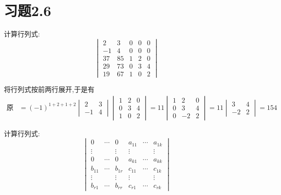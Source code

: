 \documentclass{ctexart}
\begin{document}
\section*{习题2.6}
\begin{homework}[1]
    计算行列式:
    \[\begin{vmatrix}
        2&3&0&0&0\\
        -1&4&0&0&0\\
        37&85&1&2&0\\
        29&73&0&3&4\\
        19&67&1&0&2
    \end{vmatrix}\]
\end{homework}
\begin{solution}
    将行列式按前两行展开,于是有
    \[\begin{aligned}
        \text{原行列式}
        &= (-1)^{1+2+1+2}\begin{vmatrix}
                2&3\\
                -1&4
            \end{vmatrix}\begin{vmatrix}
                1&2&0\\
                0&3&4\\
                1&0&2
            \end{vmatrix}=11\begin{vmatrix}
                1&2&0\\
                0&3&4\\
                0&-2&2
            \end{vmatrix}=11\begin{vmatrix}
                3&4\\
                -2&2
            \end{vmatrix}=154
    \end{aligned}\]
\end{solution}
\begin{homework}[3]
    计算行列式:
    \[\begin{vmatrix}
        0&\cdots&0&a_{11}&\cdots&a_{1k}\\
        \vdots& &\vdots&\vdots& &\vdots\\
        0&\cdots&0&a_{k1}&\cdots&a_{kk}\\
        b_{11}&\cdots&b_{1r}&c_{11}&\cdots&c_{1k}\\
        \vdots& &\vdots&\vdots& &\vdots\\
        b_{r1}&\cdots&b_{rr}&c_{r1}&\cdots&c_{rk}
    \end{vmatrix}\]
\end{homework}
\end{document}

